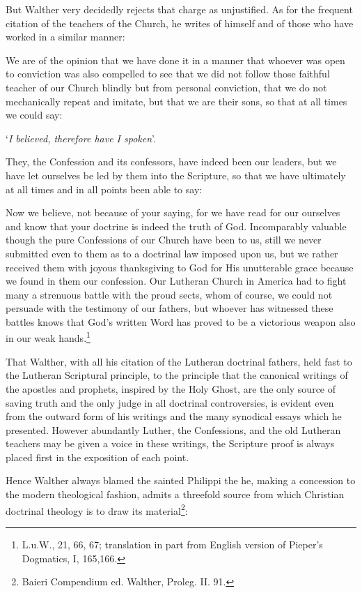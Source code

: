                 But Walther very decidedly rejects that charge as unjustified.  As for the frequent citation of the teachers of the Church, he writes of himself and of those who have worked in a similar manner: \begin{fancyquotes}We are of the opinion that we have done it in a manner that whoever was open to conviction was also compelled to see that we did not follow those faithful teacher of our Church blindly but from personal conviction, that we do not mechanically repeat and imitate, but that we are their sons, so that at all times we could say: \begin{displayquote}‘\textit{I believed, therefore have I spoken}’.\end{displayquote}  They, the Confession and its confessors, have indeed been our leaders, but we have let ourselves be led by them into the Scripture, so that we have ultimately at all times and in all points been able to say: \begin{displayquote}{\footnotesize Now we believe, not because of your saying, for we have read for our ourselves and know that your doctrine is indeed the truth of God.  Incomparably valuable though the pure Confessions of our Church have been to us, still we never submitted even to them as to a doctrinal law imposed upon us, but we rather received them with joyous thanksgiving to God for His unutterable grace because we found in them our confession.  Our Lutheran Church in America had to fight many a strenuous battle with the proud sects, whom of course, we could not persuade with the testimony of our fathers, but whoever has witnessed these battles knows that God’s written Word has proved to be a victorious weapon also in our weak hands.\footnote{L.u.W., 21, 66, 67; translation in part from English version of Pieper’s Dogmatics, I, 165,166.}}\end{displayquote}\end{fancyquotes} That Walther, with all his citation of the Lutheran doctrinal fathers, held fast to the Lutheran Scriptural principle, to the principle that the canonical writings of the apostles and prophets, inspired by the Holy Ghost, are the only source of saving truth and the only judge in all doctrinal controversies, is evident even from the outward form of his writings and the many synodical essays which he presented.  However abundantly Luther, the Confessions, and the old Lutheran teachers may be given a voice in these writings, the Scripture proof is always placed first in the exposition of each point. \par Hence Walther always blamed the sainted Philippi the he, making a concession to the modern theological fashion, admits a threefold source from which Christian doctrinal theology is to draw its material\footnote{Baieri Compendium ed. Walther, Proleg. II. 91.}:
